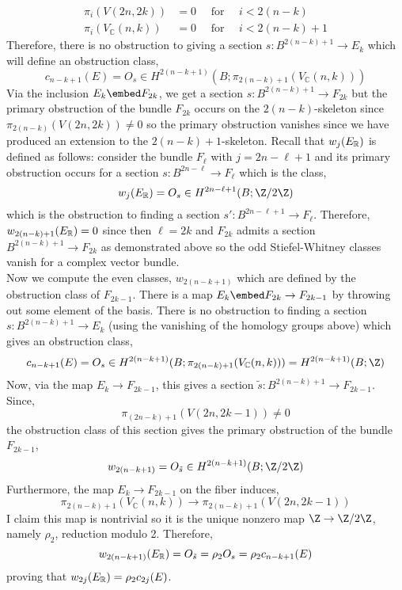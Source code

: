 \documentclass[12pt]{extarticle}
\newcommand{\C}{\mathbb{C}}
\begin{document}
\begin{align*}
\pi_i(V(2n, 2k)) &= 0 \quad \text{ for } \quad i < 2(n - k) 
\\
\pi_i(V_\C(n, k)) &= 0 \quad \text{ for } \quad i < 2 (n - k) + 1
\end{align*} 
Therefore, there is no obstruction to giving a section $s : B^{2 (n - k) + 1} \to E_k$ which will define an obstruction class,
\[ c_{n - k + 1}(E) = O_s \in H^{2(n - k + 1)}(B; \pi_{2(n - k) + 1}(V_\C(n, k))) \]
Via the inclusion $E_k \embed F_{2k}$, we get a section $s : B^{2 (n - k) + 1} \to F_{2k}$ but the primary obstruction of the bundle $F_{2k}$ occurs on the $2(n - k)$-skeleton since $\pi_{2(n-k)}(V(2n, 2k)) \neq 0$ so the primary obstruction vanishes since we have produced an extension to the $2(n-k) + 1$-skeleton. Recall that $w_{j}(E_{\mathbb{R}})$ is defined as follows: consider the bundle $F_{\ell}$ with $j = 2n - \ell + 1$ and its primary obstruction occurs for a section $s : B^{2n-\ell} \to F_{\ell}$ which is the class,
\[ w_{j}(E_\R) = O_{s} \in H^{2n - \ell + 1}(B; \Z / 2 \Z) \]
which is the obstruction to finding a section $s' : B^{2n - \ell + 1} \to F_{\ell}$. Therefore, $w_{2(n - k) + 1}(E_{\mathbb{R}}) = 0$ since then $\ell = 2 k$ and $F_{2k}$ admits a section $B^{2(n - k) + 1} \to F_{2k}$ as demonstrated above so the odd Stiefel-Whitney classes vanish for a complex vector bundle.
\bigskip\\
Now we compute the even classes, $w_{2(n-k + 1)}$ which are defined by the obstruction class of $F_{2k - 1}$. There is a map $E_{k} \embed F_{2k} \to F_{2k - 1}$ by throwing out some element of the basis. There is no obstruction to finding a section $s : B^{2(n - k) + 1} \to E_k$ (using the vanishing of the homology groups above) which gives an obstruction class,
\[ c_{n-k+1}(E) = O_s \in H^{2(n - k + 1)}(B; \pi_{2(n-k) + 1}(V_\C(n, k))) = H^{2(n - k + 1)}(B; \Z) \]
Now, via the map $E_{k} \to F_{2k - 1}$, this gives a section $\tilde{s} : B^{2(n - k) + 1} \to F_{2k - 1}$. Since,
\[ \pi_{(2 n - k) + 1}(V(2n, 2k - 1)) \neq 0 \]
the obstruction class of this section gives the primary obstruction of the bundle $F_{2k - 1}$,
\[ w_{2(n - k + 1)} = O_{\tilde{s}} \in H^{2(n - k + 1)}(B; \Z / 2 \Z) \]
Furthermore, the map $E_k \to F_{2k - 1}$ on the fiber induces,
\[ \pi_{2(n - k) + 1}(V_\C(n, k)) \to \pi_{2(n - k) + 1}(V(2n, 2k - 1)) \]
I claim this map is nontrivial so it is the unique nonzero map $\Z \to \Z / 2 \Z$, namely $\rho_2$, reduction modulo 2. Therefore, 
\[ w_{2(n - k + 1)}(E_{\mathbb{R}}) = O_{\tilde{s}} = \rho_2 O_{s} = \rho_2 c_{n - k + 1}(E) \]
proving that $w_{2j}(E_{\mathbb{R}}) = \rho_2 c_{2j}(E)$. 
\end{document}
